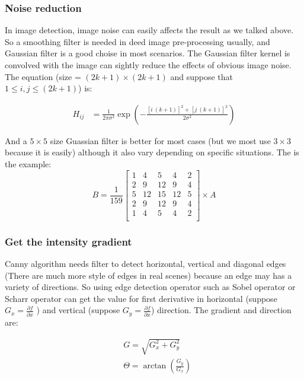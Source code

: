 \documentclass[10pt,twocolumn,letterpaper]{article}
\begin{document}
\subsubsection{Noise reduction}

In image detection, image noise can easily affects the result as we talked above. 
So a smoothing filter is needed in deed image pre-processing usually, and Gaussian filter 
is a good choise in most scenarios. The Gaussian filter kernel is convolved with the image can 
sightly reduce the effects of obvious image noise. The equation (size = $(2k + 1) \times (2k + 1)$ 
and suppose that $1 \le i, j \le (2k + 1)$) is: 

$$
\begin{aligned}
H_{ij} & = \frac{1}{2 \pi \sigma^2} \exp{\left( - \frac{[i \ (k + 1)]^2 + [j \ (k + 1)]^2}{2 \sigma^2} \right)}
\end{aligned}
$$

And a $5 \times 5$ size Guassian filter is better for most cases (but we most 
use $3 \times 3$ because it is easily) although it also vary depending on specific 
situations. The is the example: 
$$
B = \frac{1}{159}
	\begin{bmatrix}
		1 & 4 & 5 & 4 & 2 \\
		2 & 9 & 12 & 9 & 4 \\
		5 & 12 & 15 & 12 & 5 \\
		2 & 9 & 12 & 9 & 4 \\
		1 & 4 & 5 & 4 & 2 \\
	\end{bmatrix} \times A
$$

\subsubsection{Get the intensity gradient}

Canny algorithm needs filter to detect horizontal, vertical and diagonal edges (There are 
much more style of edges in real scenes) because an edge may has a variety of directions. 
So using edge detection operator such as Sobel operator or Scharr operator can get the 
value for first derivative in horizontal (suppose $G_x = \frac{\partial f}{\partial x}$
) and vertical (suppose $G_y =  \frac{\partial f}{\partial x}$) direction. The 
gradient and direction are:

$$
\begin{aligned}
& G = \sqrt{G_x^2 + G_y^2} \\
& \Theta = \arctan{\left( \frac{G_y}{G_x} \right)}
\end{aligned}
$$
\end{document}
